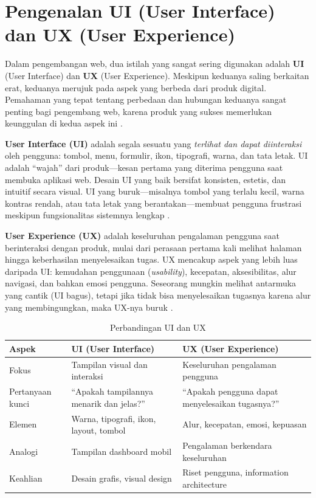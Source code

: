 ﻿\section{Pengenalan UI (User Interface) dan UX (User Experience)}

Dalam pengembangan web, dua istilah yang sangat sering digunakan adalah \textbf{UI} (User Interface) dan \textbf{UX} (User Experience). Meskipun keduanya saling berkaitan erat, keduanya merujuk pada aspek yang berbeda dari produk digital. Pemahaman yang tepat tentang perbedaan dan hubungan keduanya sangat penting bagi pengembang web, karena produk yang sukses memerlukan keunggulan di kedua aspek ini \cite{mdnLearn}.

\textbf{User Interface (UI)} adalah segala sesuatu yang \textit{terlihat dan dapat diinteraksi} oleh pengguna: tombol, menu, formulir, ikon, tipografi, warna, dan tata letak. UI adalah ``wajah'' dari produk---kesan pertama yang diterima pengguna saat membuka aplikasi web. Desain UI yang baik bersifat konsisten, estetis, dan intuitif secara visual. UI yang buruk---misalnya tombol yang terlalu kecil, warna kontras rendah, atau tata letak yang berantakan---membuat pengguna frustrasi meskipun fungsionalitas sistemnya lengkap \cite{webdevLearn}.

\textbf{User Experience (UX)} adalah keseluruhan pengalaman pengguna saat berinteraksi dengan produk, mulai dari perasaan pertama kali melihat halaman hingga keberhasilan menyelesaikan tugas. UX mencakup aspek yang lebih luas daripada UI: kemudahan penggunaan (\textit{usability}), kecepatan, aksesibilitas, alur navigasi, dan bahkan emosi pengguna. Seseorang mungkin melihat antarmuka yang cantik (UI bagus), tetapi jika tidak bisa menyelesaikan tugasnya karena alur yang membingungkan, maka UX-nya buruk \cite{nngroup}.

\begin{table}[H]
\centering
\begin{tabular}{|P{3cm}|P{4.5cm}|P{4.5cm}|}
\hline
\textbf{Aspek} & \textbf{UI (User Interface)} & \textbf{UX (User Experience)} \\
\hline
Fokus & Tampilan visual dan interaksi & Keseluruhan pengalaman pengguna \\
\hline
Pertanyaan kunci & ``Apakah tampilannya menarik dan jelas?'' & ``Apakah pengguna dapat menyelesaikan tugasnya?'' \\
\hline
Elemen & Warna, tipografi, ikon, layout, tombol & Alur, kecepatan, emosi, kepuasan \\
\hline
Analogi & Tampilan dashboard mobil & Pengalaman berkendara keseluruhan \\
\hline
Keahlian & Desain grafis, visual design & Riset pengguna, information architecture \\
\hline
\end{tabular}
\caption{Perbandingan UI dan UX}
\end{table}

